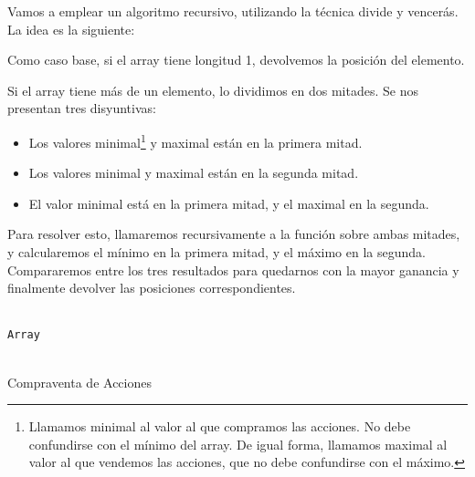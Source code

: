 \documentclass[a4paper, 11pt]{article} %
\begin{document}
	Vamos a emplear un algoritmo recursivo, utilizando la técnica divide y vencerás. 
	La idea es la siguiente: 
	
	Como caso base, si el array tiene longitud 1, devolvemos la posición del elemento. 
	
	Si el array tiene más de un elemento, lo dividimos en dos mitades. Se nos presentan tres disyuntivas:
	\begin{itemize}
		\item Los valores minimal\footnote[1]{Llamamos minimal al valor al que compramos las acciones. No debe confundirse con el mínimo del array. De igual forma, llamamos maximal al valor al que vendemos las acciones, que no debe confundirse con el máximo.}
			 y maximal están en la primera mitad.
		\item Los valores minimal y maximal están en la segunda mitad. 
		\item El valor minimal está en la primera mitad, y el maximal en la segunda. 
	\end{itemize}
	
	Para resolver esto, llamaremos recursivamente a la función sobre ambas mitades, y calcularemos el mínimo en la primera mitad, y el máximo en la segunda. Compararemos entre los tres resultados para quedarnos con la mayor ganancia y finalmente devolver las posiciones correspondientes. 
	
	\begin{algorithm}[H]
		\begin{algorithmic}[1]
			\REQUIRE \ \\
	        	\texttt{Array}\\\
	     	\ELSE
	     		\RETURN{Momentos de compra y venta}
	    	\ENDIF
		\end{algorithmic}
		\caption{Compraventa de Acciones}
		\label{algoritmo}
	\end{algorithm}
\end{document}
